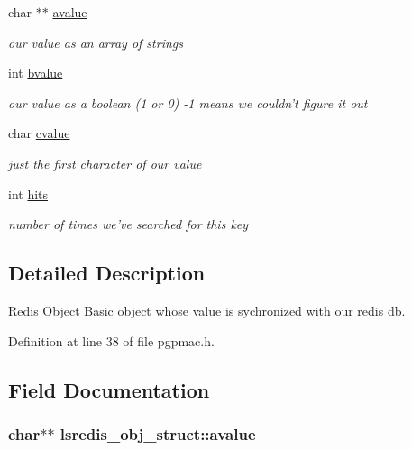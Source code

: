 \begin{DoxyCompactItemize}
char $\ast$$\ast$ \hyperlink{structlsredis__obj__struct_ac065eeede0e08f25bcfedd45022fe593}{avalue}
\begin{DoxyCompactList}\small\item\em our value as an array of strings \end{DoxyCompactList}\item 
int \hyperlink{structlsredis__obj__struct_ac3df3eaa275c1e8e333024c1fa8353af}{bvalue}
\begin{DoxyCompactList}\small\item\em our value as a boolean (1 or 0) -\/1 means we couldn't figure it out \end{DoxyCompactList}\item 
char \hyperlink{structlsredis__obj__struct_a4a5933dbd44d33d9f594f6020a443b69}{cvalue}
\begin{DoxyCompactList}\small\item\em just the first character of our value \end{DoxyCompactList}\item 
int \hyperlink{structlsredis__obj__struct_a43fcbff584654ab086d973ce34cb6ddc}{hits}
\begin{DoxyCompactList}\small\item\em number of times we've searched for this key \end{DoxyCompactList}\end{DoxyCompactItemize}


\subsection{Detailed Description}
Redis Object Basic object whose value is sychronized with our redis db. 

Definition at line 38 of file pgpmac.\-h.



\subsection{Field Documentation}
\hypertarget{structlsredis__obj__struct_ac065eeede0e08f25bcfedd45022fe593}{
\subsubsection[{avalue}]{\setlength{\rightskip}{0pt plus 5cm}char$\ast$$\ast$ lsredis\-\_\-obj\-\_\-struct\-::avalue}}\label{structlsredis__obj__struct_ac065eeede0e08f25bcfedd45022fe593}


